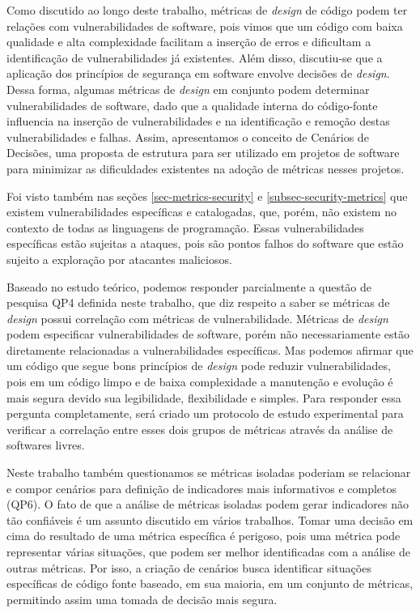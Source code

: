 Como discutido ao longo deste trabalho, métricas de \emph{design} de código podem ter relações com  vulnerabilidades de software, pois vimos que um código com baixa qualidade e alta complexidade facilitam a inserção de erros e dificultam a identificação de vulnerabilidades já existentes. Além disso, discutiu-se que a aplicação dos princípios de segurança em software envolve decisões de \emph{design}. Dessa forma, algumas métricas de \emph{design} em conjunto podem determinar vulnerabilidades de software, dado que a qualidade interna do código-fonte influencia na inserção de vulnerabilidades e na identificação e remoção destas vulnerabilidades e falhas. Assim, apresentamos o conceito de Cenários de Decisões, uma proposta de estrutura para ser utilizado em projetos de software para minimizar as dificuldades existentes na adoção de métricas nesses projetos.

%

Foi visto também nas seções \ref{sec-metrics-security} e \ref{subsec-security-metrics} que existem vulnerabilidades específicas e catalogadas, que, porém, não existem no contexto de todas as linguagens de programação. Essas vulnerabilidades específicas estão sujeitas a ataques, pois são pontos falhos do software que estão sujeito a exploração por atacantes maliciosos. 

%

Baseado no estudo teórico, podemos responder parcialmente a questão de pesquisa QP4 definida neste trabalho, que diz respeito a saber se métricas de \emph{design} possui correlação com métricas de vulnerabilidade. Métricas de \emph{design} podem especificar vulnerabilidades de software, porém não necessariamente estão diretamente relacionadas a vulnerabilidades específicas. Mas podemos afirmar que um código que segue bons princípios de \emph{design} pode reduzir vulnerabilidades, pois em um código limpo e de baixa complexidade a manutenção e evolução é mais segura devido sua legibilidade, flexibilidade e simples. Para responder essa pergunta completamente, será criado um protocolo de estudo experimental para verificar a correlação entre esses dois grupos de métricas através da análise de softwares livres.
%

Neste trabalho também questionamos se métricas isoladas poderiam se relacionar e compor cenários para definição de indicadores mais informativos e completos (QP6). O fato de que a análise de métricas isoladas podem gerar indicadores não tão confiáveis é um assunto discutido em vários trabalhos. Tomar uma decisão em cima do resultado de uma métrica específica é perigoso, pois uma métrica pode representar várias situações, que podem ser melhor identificadas com a análise de outras métricas. Por isso, a criação de cenários busca identificar situações específicas de código fonte baseado, em sua maioria, em um conjunto de métricas, permitindo assim uma tomada de decisão mais segura. 

